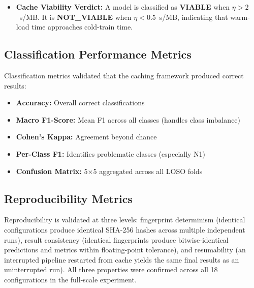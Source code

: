 \begin{itemize}
 caching still yields a $200{\times}$ ratio of compute recovered to
 I/O cost; the verdict reflects the \textit{practical} concern that
 speedup margins erode on smaller datasets, not that caching is
 net-negative in absolute terms.
 These boundaries are applied consistently in
 Figure~\ref{fig:cache_efficiency}. An alternative formulation
 $\rho = (T_{\text{cold}}/T_{\text{warm}}) / \text{size (MB)}$
 [$\times$/MB] expresses the same quantity as proportional
 speedup per MB; the two formulations agree on the
 VIABLE / NOT\_VIABLE classification of all 15 evaluated model
 types ($\rho > 1$~$\times$/MB matches $\eta > 2$~s/MB), so $\eta$
 is used throughout this thesis as the primary efficiency metric
 and $\rho$ is reported only when proportional comparison is more
 natural.

\item \textbf{Cache Viability Verdict:} A model is classified as
 \textbf{VIABLE} when $\eta > 2$~s/MB. It is \textbf{NOT\_VIABLE}
 when $\eta < 0.5$~s/MB, indicating that warm-load time approaches
 cold-train time.
\end{itemize}

\subsection{Classification Performance Metrics}

Classification metrics validated that the caching framework produced correct results:

\begin{itemize}
\item \textbf{Accuracy:} Overall correct classifications
\item \textbf{Macro F1-Score:} Mean F1 across all classes (handles class imbalance)
\item \textbf{Cohen's Kappa:} Agreement beyond chance
\item \textbf{Per-Class F1:} Identifies problematic classes (especially N1)
\item \textbf{Confusion Matrix:} 5$\times$5 aggregated across all LOSO folds
\end{itemize}

\subsection{Reproducibility Metrics}

Reproducibility is validated at three levels: fingerprint determinism
(identical configurations produce identical SHA-256 hashes across multiple
independent runs), result consistency (identical fingerprints produce
bitwise-identical predictions and metrics within floating-point tolerance),
and resumability (an interrupted pipeline restarted from cache yields the
same final results as an uninterrupted run). All three properties were
confirmed across all 18 configurations in the full-scale experiment.

